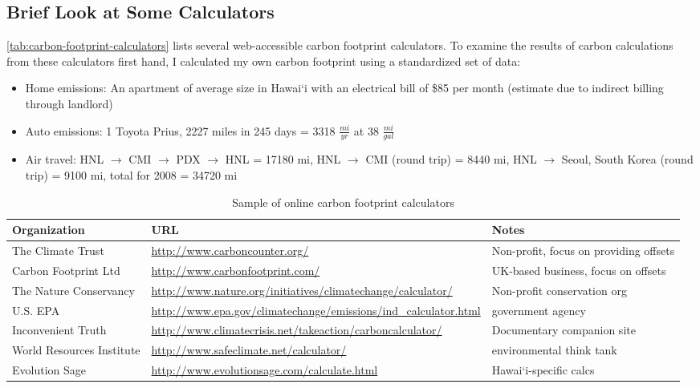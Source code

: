 \subsection{Brief Look at Some Calculators}

\autoref{tab:carbon-footprint-calculators} lists several web-accessible carbon footprint calculators. To examine the results of carbon calculations from these calculators first hand, I calculated my own carbon footprint using a standardized set of data:
\begin{itemize}
	\item Home emissions: An apartment of average size in Hawai`i with an electrical bill of \$85 per month (estimate due to indirect billing through landlord)
	\item Auto emissions: 1 Toyota Prius, 2227 miles in 245 days = 3318 $\frac{mi}{yr}$ at 38 $\frac{mi}{gal}$
	\item Air travel: HNL $\rightarrow$ CMI $\rightarrow$ PDX $\rightarrow$ HNL = 17180 mi, HNL $\rightarrow$ CMI (round trip) = 8440 mi, HNL $\rightarrow$ Seoul, South Korea (round trip) = 9100 mi, total for 2008 = 34720 mi
\end{itemize}

\begin{table}[htbp]
	\begin{center}
		\scriptsize

		\begin{tabular}{| l | p{6.75cm} | p{5cm} |}
			\hline
			Organization & URL & Notes \\ \hline
			The Climate Trust & \url{http://www.carboncounter.org/} & Non-profit, focus on providing offsets \\ \hline
	
			Carbon Footprint Ltd & \url{http://www.carbonfootprint.com/} & UK-based business, focus on offsets \\ \hline
	
			The Nature Conservancy & \url{http://www.nature.org/initiatives/climatechange/calculator/} & Non-profit conservation org \\ \hline
	
			U.S. EPA & \url{http://www.epa.gov/climatechange/emissions/ind_calculator.html} & government agency \\ \hline

			Inconvenient Truth & \url{http://www.climatecrisis.net/takeaction/carboncalculator/} & Documentary companion site \\ \hline

			World Resources Institute & \url{http://www.safeclimate.net/calculator/} & environmental think tank \\ \hline

			Evolution Sage & \url{http://www.evolutionsage.com/calculate.html} & Hawai`i-specific calcs \\ \hline
		\end{tabular}
	\caption{Sample of online carbon footprint calculators}
	\label{tab:carbon-footprint-calculators}
	\end{center}
\end{table}

